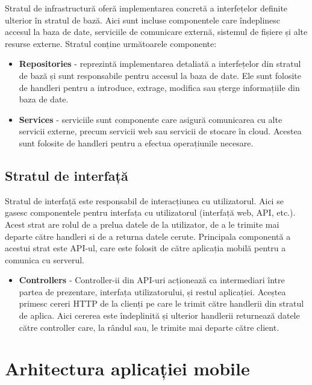 Stratul de infrastructură oferă implementarea concretă a interfețelor definite ulterior în stratul de bază. Aici sunt incluse componentele care îndeplinesc accesul la baza de date, serviciile de comunicare externă, sistemul de fișiere și alte resurse externe. Stratul conține următoarele componente:

\begin{itemize}
    \item \textbf{Repositories} - reprezintă implementarea detaliată a interfețelor din stratul de bază și sunt responsabile pentru accesul la baza de date. Ele sunt folosite de handleri pentru a introduce, extrage, modifica sau șterge informațiile din baza de date.
    \item \textbf{Services} - serviciile sunt componente care 
    asigură comunicarea cu alte servicii externe, precum servicii web sau servicii de stocare în cloud. Acestea sunt folosite de handleri pentru a efectua operațiunile necesare.
\end{itemize}

\subsection{Stratul de interfață}

Stratul de interfață este responsabil de interacțiunea cu utilizatorul. Aici se gasesc componentele pentru interfața cu utilizatorul (interfață web, API, etc.). Acest strat are rolul de a prelua datele de la utilizator, de a le trimite mai departe către handleri si de a returna datele cerute. Principala componentă a acestui strat este API-ul, care este folosit de către aplicația mobilă pentru a comunica cu serverul.

\begin{itemize}
    \item \textbf{Controllers} - Controller-ii din API-uri acționează ca intermediari între partea de prezentare, interfața utilizatorului, și restul aplicației. Aceștea primesc cereri HTTP de la clienți pe care le trimit către handlerii din stratul de aplica. Aici cererea este îndeplinită și ulterior handlerii returnează datele către controller care, la rândul sau, le trimite mai departe către client.
\end{itemize}

\newpage


\section{Arhitectura aplicației mobile}

